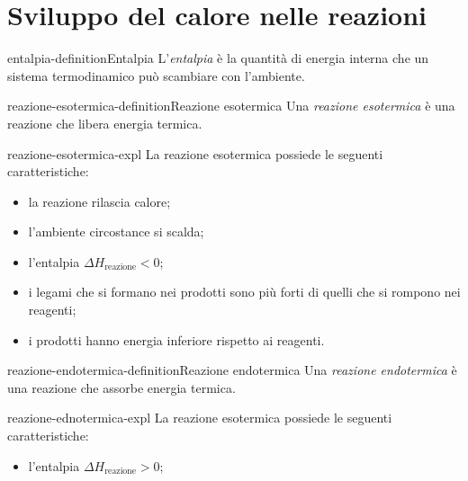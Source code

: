 \documentclass[preview]{standalone}
\begin{document}
\genpage

\section{Sviluppo del calore nelle reazioni}



\begin{snippetdefinition}{entalpia-definition}{Entalpia}
    L'\textit{entalpia} è la quantità di energia interna che un sistema
    termodinamico può scambiare con l'ambiente.
\end{snippetdefinition}

\begin{snippetdefinition}{reazione-esotermica-definition}{Reazione esotermica}
    Una \textit{reazione esotermica} è una reazione che libera energia termica.
\end{snippetdefinition}

\begin{snippet}{reazione-esotermica-expl}
    La reazione esotermica possiede le seguenti caratteristiche:
    \begin{itemize}
        \item la reazione rilascia calore;
        \item l'ambiente circostance si scalda;
        \item l'entalpia \(\Delta H_{\text{reazione}} < 0\);
        \item i legami che si formano nei prodotti sono più forti di quelli che si rompono nei reagenti;
        \item i prodotti hanno energia inferiore rispetto ai reagenti.
    \end{itemize}
\end{snippet}

\begin{snippetdefinition}{reazione-endotermica-definition}{Reazione endotermica}
    Una \textit{reazione endotermica} è una reazione che assorbe energia termica.
\end{snippetdefinition}

\begin{snippet}{reazione-ednotermica-expl}
    La reazione esotermica possiede le seguenti caratteristiche:
    \begin{itemize}
        \item l'entalpia \(\Delta H_{\text{reazione}} > 0\);
    \end{itemize}
\end{snippet}
\end{document}
